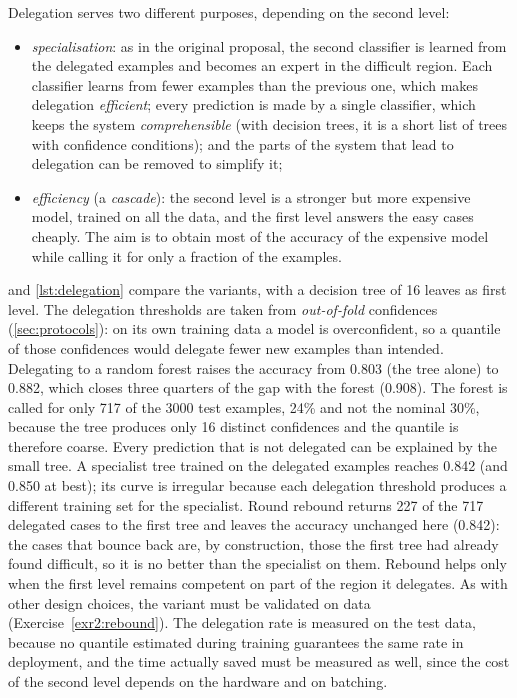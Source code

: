 Delegation serves two different purposes, depending on the second level:
\begin{itemize}
  \item \emph{specialisation}: as in the original proposal, the second classifier is learned
        from the delegated examples and becomes an expert in the difficult region. Each
        classifier learns from fewer examples than the previous one, which makes delegation
        \emph{efficient}; every prediction is made by a single classifier, which keeps the system
        \emph{comprehensible} (with decision trees, it is a short list of trees with confidence
        conditions); and the parts of the system that lead to delegation can be removed to
        simplify it;
  \item \emph{efficiency} (a \emph{cascade}): the second level is a stronger but more expensive
        model, trained on all the data, and the first level answers the easy cases cheaply. The
        aim is to obtain most of the accuracy of the expensive model while calling it for only a
        fraction of the examples.
\end{itemize}

 and \cref{lst:delegation} compare the variants, with a decision tree of
16 leaves as first level. The delegation thresholds are taken from \emph{out-of-fold} confidences
(\cref{sec:protocols}): on its own training data a model is overconfident, so a quantile of those confidences would
delegate fewer new examples than intended. Delegating to a random forest raises the accuracy from 0.803 (the tree
alone) to 0.882, which closes three quarters of the gap with the forest (0.908). The forest is called for only 717 of the 3000
test examples, 24\% and not the nominal 30\%, because the tree produces only 16 distinct confidences and the quantile is
therefore coarse. Every prediction that is not delegated can be explained by the small tree. A specialist tree trained on
the delegated examples reaches 0.842 (and 0.850 at best); its curve is irregular because each delegation threshold
produces a different training set for the specialist. Round rebound returns 227 of the 717 delegated cases to the
first tree and leaves the accuracy unchanged here (0.842): the cases that bounce back are, by construction, those the
first tree had already found difficult, so it is no better than the specialist on them. Rebound helps only when
the first level remains competent on part of the region it delegates. As with other design choices, the
variant must be validated on data (Exercise~\ref{exr2:rebound}). The delegation rate is measured on the test data,
because no quantile estimated during training guarantees the same rate in deployment, and the time actually saved
must be measured as well, since the cost of the second level depends on the hardware and on batching.

